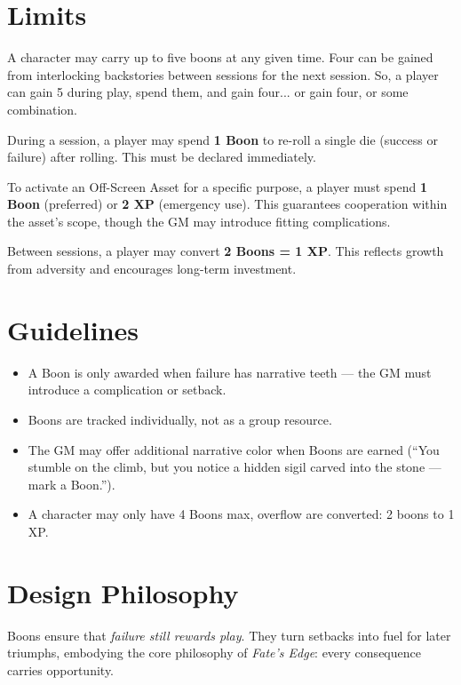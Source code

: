 \documentclass[12pt]{book}
\begin{document}
\section*{Limits}
A character may carry up to five boons at any given time. Four can be gained from interlocking backstories between sessions for the next session. So, a player can gain 5 during play, spend them, and gain four... or gain four, or some combination.

\begin{description}[leftmargin=2cm]
  \item[Re-roll Opportunity:] During a session, a player may spend \textbf{1 Boon} to re-roll a single die (success or failure) after rolling. This must be declared immediately.
  \item[Asset Activation:] To activate an Off-Screen Asset for a specific purpose, a player must spend \textbf{1 Boon} (preferred) or \textbf{2 XP} (emergency use). This guarantees cooperation within the asset’s scope, though the GM may introduce fitting complications.
  \item[Experience Conversion:] Between sessions, a player may convert \textbf{2 Boons = 1 XP}. This reflects growth from adversity and encourages long-term investment.
\end{description}

\section*{Guidelines}
\begin{itemize}
  \item A Boon is only awarded when failure has narrative teeth — the GM must introduce a complication or setback.
  \item Boons are tracked individually, not as a group resource.
  \item The GM may offer additional narrative color when Boons are earned (“You stumble on the climb, but you notice a hidden sigil carved into the stone — mark a Boon.”).
  \item A character may only have 4 Boons max, overflow are converted: 2 boons to 1 XP.
\end{itemize}

\section*{Design Philosophy}
Boons ensure that \emph{failure still rewards play}. They turn setbacks into fuel for later triumphs, embodying the core philosophy of \textit{Fate’s Edge}: every consequence carries opportunity.  
\end{document}

